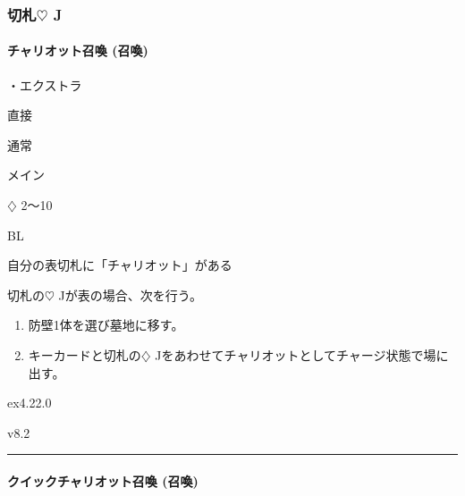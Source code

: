 \documentclass[letterpaper,10pt,dvipdfmx]{sphinxmanual}
\begin{document}
\subsubsection{切札{\normalsize $\heartsuit$} J}
\label{\detokenize{auto/frameActionlist:id46}}

\paragraph{チャリオット召喚 (召喚)}
\label{\detokenize{auto/frameActionlist:act-summonchariot}}\label{\detokenize{auto/frameActionlist:id47}}
\sphinxAtStartPar
{}

\sphinxAtStartPar
・エクストラ

\sphinxAtStartPar
{} 直接

\sphinxAtStartPar
{} 通常

\sphinxAtStartPar
{} メイン

\sphinxAtStartPar
{} {\normalsize $\diamondsuit$} 2〜10

\sphinxAtStartPar
{} BL

\sphinxAtStartPar
{}

\sphinxAtStartPar
自分の表切札に「チャリオット」がある

\sphinxAtStartPar
{}

\sphinxAtStartPar
切札の{\normalsize $\heartsuit$} Jが表の場合、次を行う。
\begin{enumerate}
%
\item {} 
\sphinxAtStartPar
防壁1体を選び墓地に移す。

\item {} 
\sphinxAtStartPar
キーカードと切札の{\normalsize $\diamondsuit$} Jをあわせてチャリオットとしてチャージ状態で場に出す。

\end{enumerate}

\sphinxAtStartPar
{}  ex4.22.0

\sphinxAtStartPar
{}  v8.2


\bigskip\hrule\bigskip



\paragraph{クイックチャリオット召喚 (召喚)}
\label{\detokenize{auto/frameActionlist:act-quicksummonchariot}}\label{\detokenize{auto/frameActionlist:id48}}
\sphinxAtStartPar
{}
\end{document}
